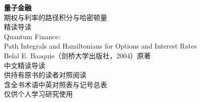\documentclass[11pt,a4paper,twoside,openright]{ctexbook}
\begin{document}
\frontmatter
\begin{titlepage}
\centering
{\Huge\bfseries 量子金融\\[0.8em]}
{\LARGE 期权与利率的路径积分与哈密顿量\\[0.4em]}
{\LARGE 精读导读\\[5em]}
{\Large Quantum Finance:\\
Path Integrals and Hamiltonians for Options and Interest Rates\\[3em]}
{\Large Belal E. Baaquie（剑桥大学出版社，2004）原著\\[1.5em]}
{\large 中文精读导读\\[0.5em]}
{\large 供持有原书的读者对照阅读\\[0.3em]
含全书术语中英对照表与记号总表\\[3em]}
{\large 仅供个人学习研究使用\\[2em]}
\end{titlepage}
\thispagestyle{empty}\mbox{}\clearpage


\tableofcontents

\mainmatter













\appendix



\end{document}
